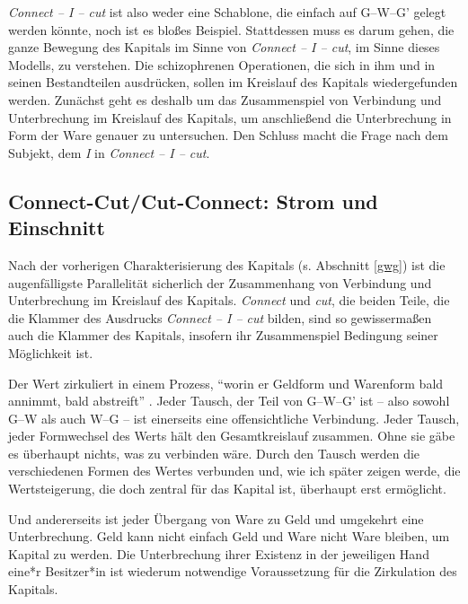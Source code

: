 \documentclass[12pt,
               paper=a4,
               twoside=false,
               onehalfspacing,
               bibliography=totoc,
               toc=graduated,
               ]{scrartcl}
\newcommand{\pc}[2]{\parencite[#1]{#2}}
\newcommand{\worries}[1]{\ifdraft{\textcolor{blue}{\texttt{(#1)}}}{}}
\newcommand{\gwg}{G--W--G'\xspace}
\newcommand{\cic}{Connect -- I -- cut\xspace}
\begin{document}
\emph{\cic} ist also weder eine Schablone, die einfach auf \gwg gelegt
werden könnte, noch ist es bloßes Beispiel. Stattdessen muss es darum
gehen, die ganze Bewegung des Kapitals im Sinne von \emph{\cic}, im
Sinne dieses Modells, zu verstehen. Die schizophrenen Operationen, die
sich in ihm und in seinen Bestandteilen ausdrücken, sollen im
Kreislauf des Kapitals wiedergefunden werden. Zunächst geht es deshalb
um das Zusammenspiel von Verbindung und Unterbrechung im Kreislauf des
Kapitals, um anschließend die Unterbrechung in Form der Ware genauer
zu untersuchen. Den Schluss macht die Frage nach dem Subjekt, dem
\emph{I} in \emph{\cic}.



\subsection{Connect-Cut/Cut-Connect: Strom und Einschnitt}


Nach der vorherigen Charakterisierung des Kapitals (s. Abschnitt
\ref{gwg}) ist die augenfälligste Parallelität sicherlich der
Zusammenhang von Verbindung und Unterbrechung im Kreislauf des
Kapitals. \emph{Connect} und \emph{cut}, die beiden Teile, die die
Klammer des Ausdrucks \emph{\cic} bilden, sind so gewissermaßen auch
die Klammer des Kapitals, insofern ihr Zusammenspiel Bedingung seiner
Möglichkeit ist.


Der Wert zirkuliert in einem Prozess, "`worin er Geldform und
Warenform bald annimmt, bald abstreift"' \pc{169}{kap}. Jeder Tausch,
der Teil von \gwg ist -- also sowohl G--W als auch W--G -- ist
einerseits eine offensichtliche Verbindung. Jeder Tausch, jeder
Formwechsel des Werts hält den Gesamtkreislauf zusammen. Ohne sie gäbe
es überhaupt nichts, was zu verbinden wäre. Durch den Tausch werden
die verschiedenen Formen des Wertes verbunden und, wie ich später
zeigen werde, die Wertsteigerung, die doch zentral für das Kapital
ist, überhaupt erst ermöglicht.


Und andererseits ist jeder Übergang von Ware zu Geld und umgekehrt
eine Unterbrechung. Geld kann nicht einfach Geld und Ware nicht Ware
bleiben, um Kapital zu werden. Die Unterbrechung ihrer Existenz in der
jeweiligen Hand eine*r Besitzer*in ist wiederum notwendige
Voraussetzung für die Zirkulation des Kapitals.
\end{document}
